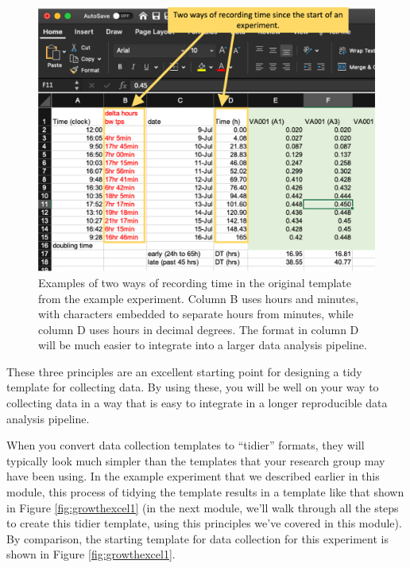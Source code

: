 \documentclass[]{tufte-book}
\begin{document}
\begin{figure}
\includegraphics[width=\textwidth]{figures/growth_curve_recording_time} \caption[Examples of two ways of recording time in the original template from the example experiment]{Examples of two ways of recording time in the original template from the example experiment. Column B uses hours and minutes, with characters embedded to separate hours from minutes, while column D uses hours in decimal degrees. The format in column D will be much easier to integrate into a larger data analysis pipeline.}\label{fig:recordingtime}
\end{figure}

These three principles are an excellent starting point for designing a tidy
template for collecting data. By using these, you will be well on your way to
collecting data in a way that is easy to integrate in a longer reproducible data
analysis pipeline.

When you convert data collection templates to ``tidier'' formats, they will
typically look much simpler than the templates that your research group may have
been using. In the example experiment that we described earlier in this module,
this process of tidying the template results in a template like that shown in
Figure \ref{fig:growthexcel1} (in the next module, we'll walk through all the
steps to create this tidier template, using this principles we've covered in
this module). By comparison, the starting template for data collection for this
experiment is shown in Figure \ref{fig:growthexcel1}.
\end{document}
